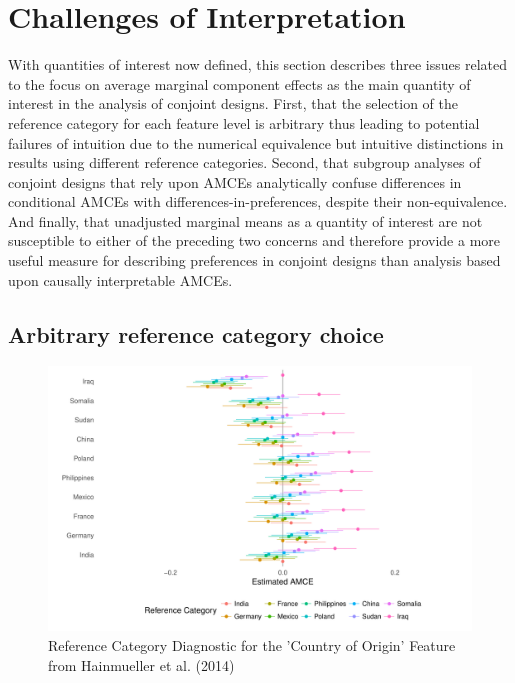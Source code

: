 \documentclass[a4paper,12pt]{article}\usepackage[]{graphicx}\usepackage[]{color}
\makeatletter
\def\maxwidth{ %
  \ifdim\Gin@nat@width>\linewidth
    \linewidth
  \else
    \Gin@nat@width
  \fi
}
\newenvironment{knitrout}{}{} %
\makeatother
\begin{document}
\section{Challenges of Interpretation}\label{sec:challenges}

With quantities of interest now defined, this section describes three issues related to the focus on average marginal component effects as the main quantity of interest in the analysis of conjoint designs. First, that the selection of the reference category for each feature level is arbitrary thus leading to potential failures of intuition due to the numerical equivalence but intuitive distinctions in results using different reference categories. Second, that subgroup analyses of conjoint designs that rely upon AMCEs analytically confuse differences in conditional AMCEs with differences-in-preferences, despite their non-equivalence. And finally, that unadjusted marginal means as a quantity of interest are not susceptible to either of the preceding two concerns and therefore provide a more useful measure for describing preferences in conjoint designs than analysis based upon causally interpretable AMCEs.

\subsection{Arbitrary reference category choice}\label{sec:reference}

\begin{knitrout}
\color{fgcolor}\begin{figure}
\includegraphics[width=\maxwidth]{figure/reference_category-1} \caption[Reference Category Diagnostic for the 'Country of Origin' Feature from Hainmueller et al]{Reference Category Diagnostic for the 'Country of Origin' Feature from Hainmueller et al. (2014)}\label{fig:reference_category}
\end{figure}


\end{knitrout}
\end{document}
